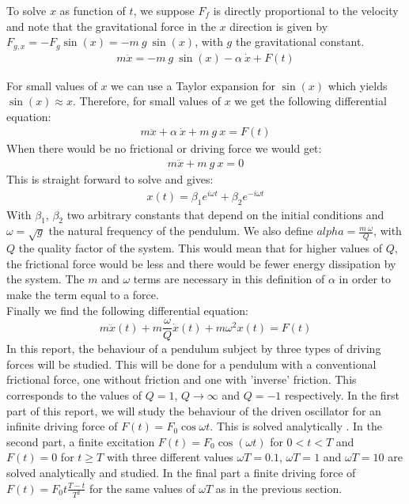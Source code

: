 To solve $x$ as function of $t$, we suppose $F_f$ is directly proportional to the velocity and note that the gravitational force in the $x$ direction is given by $F_{g,x} = - F_g \sin(x) = - m \: g \: \sin(x)$, with $g$ the gravitational constant.
\begin{align*}
	m \ddot{x} = - m \: g \: \sin(x) - \alpha \: \dot{x} + F(t)
\end{align*}

For small values of $x$ we can use a Taylor expansion for $\sin(x)$ which yields $\sin(x) \approx x$. Therefore, for small values of $x$ we get the following differential equation:
\begin{align*}
	m \ddot{x} + \alpha \: \dot{x} + m \: g \: x = F(t)
\end{align*}
When there would be no frictional or driving force we would get:
\begin{align*}
	m \ddot{x} + m \: g \: x = 0
\end{align*}
This is straight forward to solve and gives:
\begin{align*}
	x(t) = \beta_1 e^{i \omega t} + \beta_2 e^{-i \omega t}
\end{align*}
With $\beta_1$, $\beta_2$ two arbitrary constants that depend on the initial conditions and $\omega = \sqrt{g}$ the natural frequency of the pendulum. We also define $alpha =\frac{m \: \omega}{Q}$, with $Q$ the quality factor of the system. This would mean that for higher values of $Q$, the frictional force would be less and there would be fewer energy dissipation by the system. The $m$ and $\omega$ terms are necessary in this definition of $\alpha$ in order to make the term equal to a force. \\
Finally we find the following differential equation:
\begin{equation}
	m \ddot{x}(t) + m \frac{\omega}{Q} \dot{x}(t) + m \omega^2 x(t) = F(t)
	\label{eq_diff}
\end{equation}
In this report, the behaviour of a pendulum subject by three types of driving forces will be studied. This will be done for a pendulum with a conventional frictional force, one without friction and one with 'inverse' friction. This corresponds to the values of $Q=1$, $Q \rightarrow \infty$ and $Q=-1$ respectively.
In the first part of this report, we will study the behaviour of the driven oscillator for an infinite driving force of $F(t) = F_0 \cos{\omega t}$. This is solved analytically . In the second part, a finite excitation $F(t) = F_0 \cos(\omega t)$ for $0 < t < T$ and $F(t) = 0$ for $t \geq T$ with three different values $\omega T = 0.1$, $\omega T = 1$ and $\omega T = 10$ are solved analytically and studied. In the final part a finite driving force of $ F(t) = F_0 t\frac{T-t}{T^2}$ for the same values of $\omega T$ as in the previous section. \\








